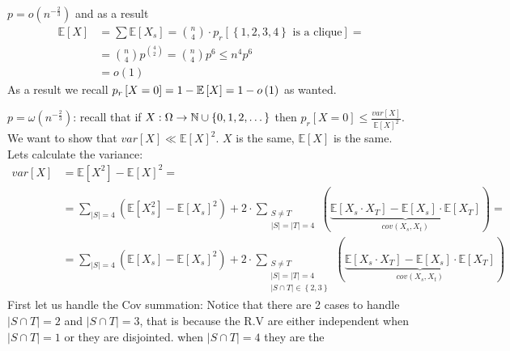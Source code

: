 \begin{casenv}
\item $p=o\left(n^{-\frac{2}{3}}\right)$ and as a result 
\begin{align*}
\mathbb{E}\left[X\right] & =\sum\mathbb{E}\left[X_{s}\right]=\binom{n}{4}\cdot p_{r}\left[\left\{ 1,2,3,4\right\} \text{ is a clique}\right]=\\
 & =\binom{n}{4}p^{\binom{4}{2}}=\binom{n}{4}p^{6}\le n^{4}p^{6}\\
 & =o\left(1\right)
\end{align*}
As a result we recall $p_{r}\left[X=0\right]=1-\mathbb{E}\left[X\right]=1-o\left(1\right)$
as wanted.
\item $p=\omega\left(n^{-\frac{2}{3}}\right)$: recall that if $X:\Omega\to\mathbb{N}\cup\left\{ 0,1,2,\dots\right\} $
then $p_{r}\left[X=0\right]\le\frac{var\left[X\right]}{\mathbb{E}\left[X\right]^{2}}$.
We want to show that $var\left[X\right]\ll\mathbb{E}\left[X\right]^{2}$.
$X$ is the same, $\mathbb{E}\left[X\right]$ is the same. Lets calculate
the variance: 
\begin{align*}
var\left[X\right] & =\mathbb{E}\left[X^{2}\right]-\mathbb{E}\left[X\right]^{2}=\\
 & =\sum_{\left|S\right|=4}\left(\mathbb{E}\left[X_{s}^{2}\right]-\mathbb{E}\left[X_{s}\right]^{2}\right)+2\cdot\sum_{\begin{array}{c}
S\ne T\\
\left|S\right|=\left|T\right|=4
\end{array}}\left(\underbrace{\mathbb{E}\left[X_{s}\cdot X_{T}\right]-\mathbb{E}\left[X_{s}\right]\cdot\mathbb{E}\left[X_{T}\right]}_{cov\left(X_{s},X_{t}\right)}\right)=\\
 & =\sum_{\left|S\right|=4}\left(\mathbb{E}\left[X_{s}\right]-\mathbb{E}\left[X_{s}\right]^{2}\right)+2\cdot\sum_{\begin{array}{c}
S\ne T\\
\left|S\right|=\left|T\right|=4\\
\left|S\cap T\right|\in\left\{ 2,3\right\} 
\end{array}}\left(\underbrace{\mathbb{E}\left[X_{s}\cdot X_{T}\right]-\mathbb{E}\left[X_{s}\right]\cdot\mathbb{E}\left[X_{T}\right]}_{cov\left(X_{s},X_{t}\right)}\right)
\end{align*}
First let us handle the Cov summation: Notice that there are 2 cases
to handle $\left|S\cap T\right|=2$ and $\left|S\cap T\right|=3$,
that is because the R.V are either independent when $\left|S\cap T\right|=1$
or they are disjointed. when $\left|S\cap T\right|=4$ they are the

\end{casenv}
